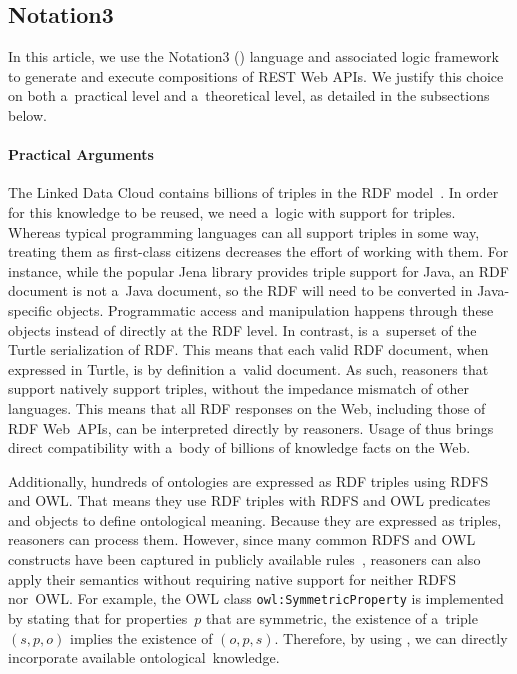 \subsection{Notation3}
\label{subsec:TechnologiesN3}
In this article, we use the Notation3 (\nthree) language and associated logic framework
to generate and execute compositions of REST Web APIs.
We justify this choice on both a~practical level
and a~theoretical level, as detailed in the subsections below.

\paragraph{Practical Arguments}
The Linked Data Cloud contains billions of triples in the RDF model~\cite{LODCloud}.
In order for this knowledge to be reused,
we need a~logic with support for triples.
Whereas typical programming languages can all support triples in some way,
treating them as first-class citizens decreases the effort of working with them.
For instance, while the popular Jena library provides triple support for Java,
an RDF document is not a~Java document,
so the RDF will need to be converted in Java-specific objects.
Programmatic access and manipulation happens through these objects
instead of directly at the RDF level.
In contrast, \nthree is a~superset of the Turtle serialization of RDF.
This means that each valid RDF document, when expressed in Turtle,
is by definition a~valid \nthree document.
As such, reasoners that support \nthree natively support triples,
without the impedance mismatch of other languages.
This means that all RDF responses on the Web,
including those of RDF Web~APIs,
can be interpreted directly by \nthree reasoners.
Usage of \nthree thus brings direct compatibility
with a~body of billions of knowledge facts on the Web.

Additionally, hundreds of ontologies are expressed as RDF triples using RDFS and OWL.
That means they use RDF triples with RDFS and OWL predicates and objects
to define ontological meaning.
Because they are expressed as triples, \nthree reasoners can process them.
However, since many common RDFS and OWL constructs
have been captured in publicly available \nthree rules~\cite{EYE},
\nthree reasoners can also apply their semantics
without requiring native support for neither RDFS nor~OWL.
For example, the OWL class \verb!owl:SymmetricProperty!
is implemented by stating that for properties~$p$ that are symmetric,
the existence of a~triple $(s, p, o)$ implies the existence of $(o, p, s)$.
Therefore, by using \nthree, we can directly incorporate available ontological~knowledge.

